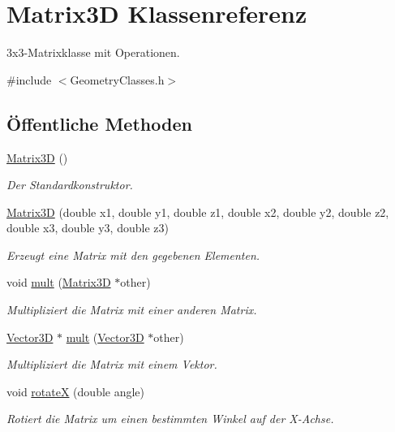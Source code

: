 \hypertarget{classMatrix3D}{\section{Matrix3\-D Klassenreferenz}
\label{classMatrix3D}
}


3x3-\/\-Matrixklasse mit Operationen.  




{\ttfamily \#include $<$Geometry\-Classes.\-h$>$}

\subsection*{Öffentliche Methoden}
\begin{DoxyCompactItemize}
\item 
\hyperlink{classMatrix3D_afe9c6b7abe858fe9f6aea8f0607a00a7}{Matrix3\-D} ()
\begin{DoxyCompactList}\small\item\em Der Standardkonstruktor. \end{DoxyCompactList}\item 
\hyperlink{classMatrix3D_abd8f512d6fdfda45bfe655ae38cde303}{Matrix3\-D} (double x1, double y1, double z1, double x2, double y2, double z2, double x3, double y3, double z3)
\begin{DoxyCompactList}\small\item\em Erzeugt eine Matrix mit den gegebenen Elementen. \end{DoxyCompactList}\item 
void \hyperlink{classMatrix3D_a399be81028219044a03439b2ff93782a}{mult} (\hyperlink{classMatrix3D}{Matrix3\-D} $\ast$other)
\begin{DoxyCompactList}\small\item\em Multipliziert die Matrix mit einer anderen Matrix. \end{DoxyCompactList}\item 
\hyperlink{classVector3D}{Vector3\-D} $\ast$ \hyperlink{classMatrix3D_adb30531e4dd89eb99ed2fb7f94269122}{mult} (\hyperlink{classVector3D}{Vector3\-D} $\ast$other)
\begin{DoxyCompactList}\small\item\em Multipliziert die Matrix mit einem Vektor. \end{DoxyCompactList}\item 
void \hyperlink{classMatrix3D_ada7ce7ea9f2d0ef0fdda60ad73dad345}{rotate\-X} (double angle)
\begin{DoxyCompactList}\small\item\em Rotiert die Matrix um einen bestimmten Winkel auf der X-\/\-Achse. \end{DoxyCompactList}\item 

\end{DoxyCompactItemize}
